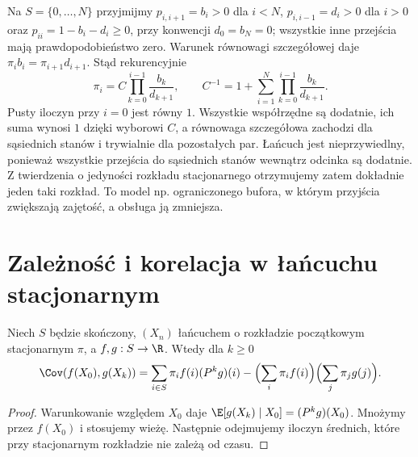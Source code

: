 \begin{przyklad}
Na $S=\{0,\ldots,N\}$ przyjmijmy
$p_{i,i+1}=b_i>0$ dla $i<N$,
$p_{i,i-1}=d_i>0$ dla $i>0$ oraz
$p_{ii}=1-b_i-d_i\geq0$, przy konwencji
$d_0=b_N=0$; wszystkie inne przejścia mają
prawdopodobieństwo zero.
Warunek równowagi szczegółowej daje
$\pi_i b_i=\pi_{i+1}d_{i+1}$.
Stąd rekurencyjnie
\[
\pi_i=C\prod_{k=0}^{i-1}\frac{b_k}{d_{k+1}},
\qquad
C^{-1}=1+\sum_{i=1}^N\prod_{k=0}^{i-1}
\frac{b_k}{d_{k+1}}.
\]
Pusty iloczyn przy $i=0$ jest równy $1$.
Wszystkie współrzędne są dodatnie, ich suma
wynosi $1$ dzięki wyborowi $C$, a równowaga
szczegółowa zachodzi dla sąsiednich stanów
i trywialnie dla pozostałych par. Łańcuch jest
nieprzywiedlny, ponieważ wszystkie przejścia
do sąsiednich stanów wewnątrz odcinka są dodatnie.
Z twierdzenia o jedyności rozkładu stacjonarnego
otrzymujemy zatem dokładnie jeden taki rozkład.
To model np. ograniczonego bufora, w którym
przyjścia zwiększają zajętość, a obsługa ją zmniejsza.
\end{przyklad}

\section{Zależność i korelacja w łańcuchu stacjonarnym}

\begin{stwierdzenie}
Niech $S$ będzie skończony, $(X_n)$ łańcuchem
o rozkładzie początkowym stacjonarnym $\pi$, a
$f,g:S\to\R$. Wtedy dla $k\geq0$
\[
\Cov(f(X_0),g(X_k))=
\sum_{i\in S}\pi_i f(i)(P^kg)(i)
-\Bigl(\sum_i\pi_i f(i)\Bigr)
 \Bigl(\sum_j\pi_jg(j)\Bigr).
\]
\end{stwierdzenie}
\begin{proof}
Warunkowanie względem $X_0$ daje
$\E[g(X_k)\mid X_0]=(P^kg)(X_0)$.
Mnożymy przez $f(X_0)$ i stosujemy wieżę.
Następnie odejmujemy iloczyn średnich,
które przy stacjonarnym rozkładzie
nie zależą od czasu.
\end{proof}


